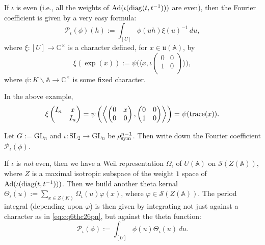 \documentclass[reqno]{amsart} 
\begin{document}
\begin{enumerate}
  If $\iota$ is even (i.e., all the weights of $\operatorname{Ad}(\iota(\operatorname{diag}(t, t^{-1})))$ are even), then the Fourier coefficient is given by a very easy formula:
  \begin{equation}\label{eq:cq6thc26pn}
    \mathcal{P}_\iota(\phi)(h) := \int_{[U]} \phi(u h) \xi(u)^{-1} \, d u,
  \end{equation}
  where $\xi :[U] \rightarrow \mathbb{C}^\times$ is a character defined, for $x \in \mathfrak{u}(\mathbb{A})$, by
  \begin{equation*}
    \xi(\exp(x)) := \psi \bigl( \langle x, \iota \left(
      \begin{smallmatrix}
        0&0\\
        1&0 \\
      \end{smallmatrix}
    \right) \rangle \bigr),
  \end{equation*}
  where $\psi : K \backslash \mathbb{A} \rightarrow \mathbb{C}^\times$ is some fixed character.
  \begin{example}
    In the above example,
    \begin{equation*}
      \xi
      \begin{pmatrix}
        I_n    & x \\
                                                                                        & I_n \\
      \end{pmatrix}
      = \psi \left( \left\langle
          \begin{pmatrix}
            0        & x \\
            0 & 0 \\
          \end{pmatrix},
          \begin{pmatrix}
            0        & 0 \\
            1 & 0 \\
          \end{pmatrix} \right\rangle \right)
      = \psi(\operatorname{trace}(x)).
    \end{equation*}
  \end{example}
  \begin{exercise}
    Let $G := \mathrm{GL}_n$ and $\iota : \mathrm{SL}_2 \rightarrow \mathrm{GL}_n$ be $\rho_{\operatorname{sym}}^{n - 1}$.  Then write down the Fourier coefficient $\mathcal{P}_\iota(\phi)$.
  \end{exercise}

  If $\iota$ is \emph{not} even, then we have a Weil representation $\Omega_\iota$ of $U(\mathbb{A})$ on $\mathcal{S}(Z(\mathbb{A}))$, where $Z$ is a maximal isotropic subspace of the weight $1$ space of $\operatorname{Ad}(\iota(\operatorname{diag}(t, t^{-1})))$.  Then we build another theta kernal $\Theta_\iota(u) := \sum_{x \in Z(K)} \Omega_\iota(u) \varphi(x)$, where $\varphi \in \mathcal{S}(Z(\mathbb{A}))$.  The period integral (depending upon $\varphi$) is then given by integrating not just against a character as in \eqref{eq:cq6thc26pn}, but against the theta function:
  \begin{equation}\label{eq:cq6thc48wh}
    \mathcal{P}_\iota(\phi) := \int_{[U]} \phi(u) \Theta_{\iota}(u) \, d u.
  \end{equation}


\end{enumerate}
\end{document}

